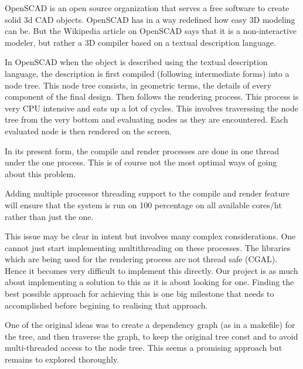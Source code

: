 \begin{Large}
\end{Large}
OpenSCAD is an open source organization that serves a free software to create solid 3d CAD objects. OpenSCAD has in a way redefined how easy 3D modeling can be. But the Wikipedia article on OpenSCAD says that it is a non-interactive modeler, but rather a 3D compiler based on a textual description language.

In OpenSCAD when the object is described using the textual description language, the description is first compiled (following intermediate forms) into a node tree. This node tree consists, in geometric terms, the details of every component of the final design. Then follows the rendering process. This process is very CPU intensive and eats up a lot of cycles. This involves traverssing the node tree from the very bottom and evaluating nodes as they are encountered. Each evaluated node is then rendered on the screen.

In its present form, the compile and render processes are done in one thread under the one process. This is of course not the most optimal ways of going about this problem.

Adding multiple processor threading support to the compile and render feature will ensure that the system is run on 100 percentage on all available cores/ht rather than just the one.

This issue may be clear in intent but involves many complex considerations. One cannot just start implementing multithreading on these processes. The libraries which are being used for the rendering process are not thread safe (CGAL). Hence it becomes very difficult to implement this directly. Our project is as much about implementing a solution to this as it is about looking for one. Finding the best possible approach for achieving this is one big milestone that needs to accomplished before begining to realising that approach.

One of the original ideas was to create a dependency graph (as in a makefile) for the tree, and then traverse the graph, to keep the original tree const and to avoid multi-threaded access to the node tree. This seems a promising approach but remains to explored thoroughly.



